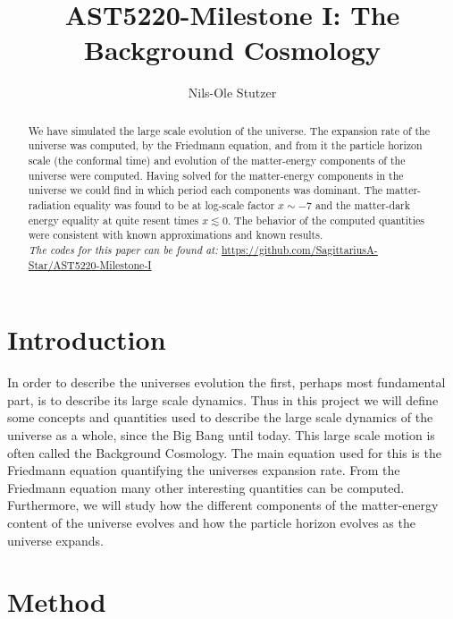 \documentclass[twocolumn]{aastex62}
\begin{document}
\title{\Large AST5220-Milestone I: The Background Cosmology}

\author{Nils-Ole Stutzer}

\begin{abstract}
    We have simulated the large scale evolution of the universe. The expansion
    rate of the universe was computed, by the Friedmann equation, and from it the particle
    horizon scale (the conformal time) and evolution of the matter-energy components of the universe were computed. 
    Having solved for the matter-energy components in the universe we could find in which period each components was dominant. 
    The matter-radiation equality was found to be at log-scale factor
    $x\sim -7$ and the matter-dark energy equality at quite resent times $x\lesssim 0$. The behavior of
    the computed quantities were consistent with known approximations and known results.\\

    \textit{The codes for this paper can be found at:} \newline \url{https://github.com/SagittariusA-Star/AST5220-Milestone-I}
\end{abstract}

\section{Introduction} \label{sec:Intro}
In order to describe the universes evolution the first, perhaps most fundamental
part, is to describe its large scale dynamics. Thus in this project we will define 
some concepts and quantities used to describe the
large scale dynamics of the universe as a whole, since the Big Bang until
today. This large scale motion is often called the Background Cosmology. 
The main equation used for this is
the Friedmann equation quantifying the universes expansion rate. From the Friedmann
equation many other interesting quantities can be computed. Furthermore, we will study how the different components
of the matter-energy content of the universe evolves and how the particle horizon
evolves as the universe expands.

\section{Method} \label{sec:Method}
\end{document}
